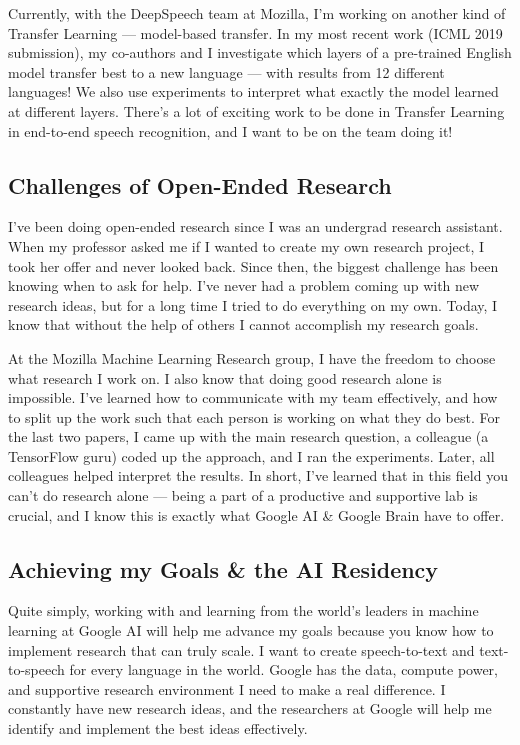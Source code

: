 \documentclass[12pt,a4paper]{article}
\begin{document}
Currently, with the DeepSpeech team at Mozilla, I'm working on another kind of Transfer Learning --- model-based transfer. In my most recent work (ICML 2019 submission), my co-authors and I investigate which layers of a pre-trained English model transfer best to a new language --- with results from 12 different languages! We also use experiments to interpret what exactly the model learned at different layers. There's a lot of exciting work to be done in Transfer Learning in end-to-end speech recognition, and I want to be on the team doing it!


\subsection*{Challenges of Open-Ended Research}

I've been doing open-ended research since I was an undergrad research assistant. When my professor asked me if I wanted to create my own research project, I took her offer and never looked back. Since then, the biggest challenge has been knowing when to ask for help. I've never had a problem coming up with new research ideas, but for a long time I tried to do everything on my own. Today, I know that without the help of others I cannot accomplish my research goals.

At the Mozilla Machine Learning Research group, I have the freedom to choose what research I work on. I also know that doing good research alone is impossible. I've learned how to communicate with my team effectively, and how to split up the work such that each person is working on what they do best. For the last two papers, I came up with the main research question, a colleague (a TensorFlow guru) coded up the approach, and I ran the experiments. Later, all colleagues helped interpret the results. In short, I've learned that in this field you can't do research alone --- being a part of a productive and supportive lab is crucial, and I know this is exactly what Google AI \& Google Brain have to offer.

\subsection*{Achieving my Goals \& the AI Residency}

Quite simply, working with and learning from the world's leaders in machine learning at Google AI will help me advance my goals because you know how to implement research that can truly scale. I want to create speech-to-text and text-to-speech for every language in the world. Google has the data, compute power, and supportive research environment I need to make a real difference. I constantly have new research ideas, and the researchers at Google will help me identify and implement the best ideas effectively.
\end{document}
